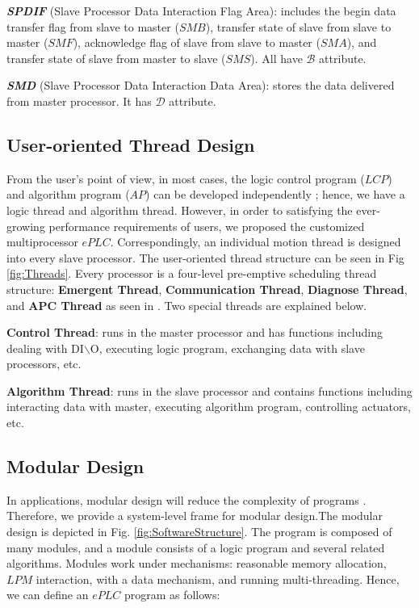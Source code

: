 \documentclass[journal,UTF8]{IEEEtran}
\begin{document}
\textbf{\emph{SPDIF}} (Slave Processor Data Interaction Flag Area): includes the begin data transfer flag from slave to master ($SMB$), transfer state of slave from slave to master ($SMF$), acknowledge flag of slave from slave to master ($SMA$), and transfer state of slave from master to slave ($SMS$). All have $\mathcal{B}$ attribute.

\textbf{\emph{SMD}} (Slave Processor Data Interaction Data Area): stores the data delivered from master processor. It has $\mathcal{D}$ attribute.

\subsection{User-oriented Thread Design}
From the user's point of view, in most cases, the logic control program ($LCP$) and algorithm program ($AP$) can be developed independently \cite{WuA}; hence, we have a logic thread and algorithm thread. However, in order to satisfying the ever-growing performance requirements of users, we proposed the customized multiprocessor $ePLC$. Correspondingly, an individual motion thread is designed into every slave processor. The user-oriented thread structure can be seen in Fig \ref{fig:Threads}. Every processor is a four-level pre-emptive scheduling thread structure: \textbf{Emergent Thread}, \textbf{Communication Thread}, \textbf{Diagnose Thread}, and \textbf{APC Thread} as seen in \cite{WuA}. Two special threads are explained below.

\textbf{Control Thread}: runs in the master processor and has functions including dealing with DI$\backslash$O, executing logic program, exchanging data with slave processors, etc.

\textbf{Algorithm Thread}: runs in the slave processor and contains functions including interacting data with master, executing algorithm program, controlling actuators, etc.

\subsection{Modular Design}  
In applications, modular design will reduce the complexity of programs \cite{Vyatkin2013Software}. Therefore, we provide a system-level frame for modular design.The modular design is depicted in Fig. \ref{fig:SoftwareStructure}. The program is composed of many modules, and a module consists of a logic program and several related algorithms. Modules work under mechanisms: reasonable memory allocation, $LPM$ interaction, with a data mechanism, and running multi-threading. Hence, we can define an $ePLC$ program as follows:
\end{document}
